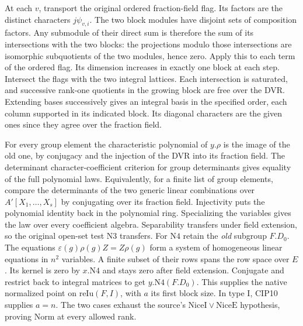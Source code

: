 At each $v$, transport the original ordered fraction-field flag.
Its factors are the distinct characters $j\psi_{v,i}$. The two block
modules have disjoint sets of composition factors. Any submodule
of their direct sum is therefore the sum of its intersections with
the two blocks: the projections modulo those intersections are
isomorphic subquotients of the two modules, hence zero. Apply this
to each term of the ordered flag. Its dimension increases in
exactly one block at each step. Intersect the flags with the two
integral lattices. Each intersection is saturated, and successive
rank-one quotients in the growing block are free over the DVR.
Extending bases successively gives an integral basis in the
specified order, each column supported in its indicated block.
Its diagonal characters are the given ones since they agree over
the fraction field.

For every group element the characteristic polynomial of $y.\rho$
is the image of the old one, by conjugacy and the injection of the
DVR into its fraction field. The determinant character-coefficient
criterion for group determinants gives equality of the full
polynomial laws. Equivalently, for a finite list of group elements,
compare the determinants of the two generic linear combinations
over $A'[X_1,\ldots,X_s]$ by conjugating over its fraction field.
Injectivity puts the polynomial identity back in the polynomial
ring. Specializing the variables gives the law over every
coefficient algebra. Separability transfers under field extension,
so the original open-set test $\mathrm{N3}$ transfers. For
$\mathrm{N4}$ retain the \emph{old} subgroup $F.D_0$.
The equations $\varepsilon(g)\rho(g)Z=Z\rho(g)$ form a system
of homogeneous linear equations in $n^2$ variables. A finite
subset of their rows spans the row space over $E$. Its kernel
is zero by $x.\mathrm{N4}$ and stays zero after field extension.
Conjugate and restrict back to integral matrices to get
$y.\mathrm{N4}(F.D_0)$. This supplies the native normalized point
on $\mathrm{reIu}(F,I)$, with $a$ its first block size. In type I,
CIP10 supplies $a=n$. The two cases exhaust the source's
$\mathrm{NiceI}\lor\mathrm{NiceE}$ hypothesis, proving
$\mathrm{Norm}$ at every allowed rank.

